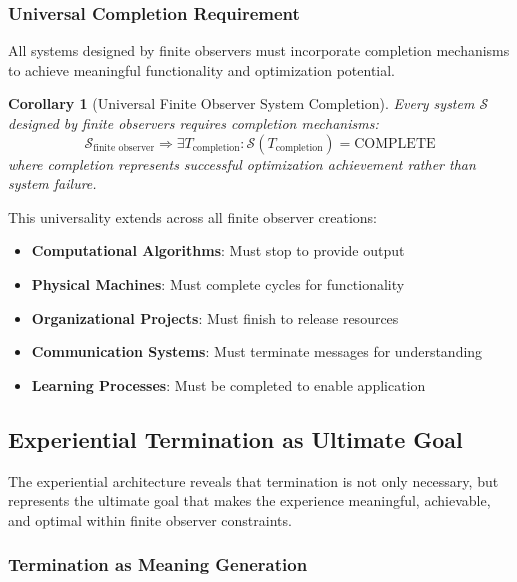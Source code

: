 \documentclass{article}
\newtheorem{corollary}[theorem]{Corollary}
\begin{document}
\subsubsection{Universal Completion Requirement}

All systems designed by finite observers must incorporate completion mechanisms to achieve meaningful functionality and optimization potential.

\begin{corollary}[Universal Finite Observer System Completion]
Every system $\mathcal{S}$ designed by finite observers requires completion mechanisms:
\begin{equation}
\mathcal{S}_{\text{finite observer}} \Rightarrow \exists T_{\text{completion}}: \mathcal{S}(T_{\text{completion}}) = \text{COMPLETE}
\end{equation}
where completion represents successful optimization achievement rather than system failure.
\end{corollary}

This universality extends across all finite observer creations:
\begin{itemize}
\item \textbf{Computational Algorithms}: Must stop to provide output
\item \textbf{Physical Machines}: Must complete cycles for functionality
\item \textbf{Organizational Projects}: Must finish to release resources
\item \textbf{Communication Systems}: Must terminate messages for understanding
\item \textbf{Learning Processes}: Must be completed to enable application
\end{itemize}

\subsection{Experiential Termination as Ultimate Goal}

The experiential architecture reveals that termination is not only necessary, but represents the ultimate goal that makes the experience meaningful, achievable, and optimal within finite observer constraints.

\subsubsection{Termination as Meaning Generation}
\end{document}
